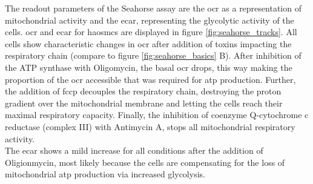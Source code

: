     The readout parameters of the Seahorse assay are the \ac{ocr} as a representation of mitochondrial activity and the \ac{ecar}, representing the glycolytic activity of the cells. \ac{ocr} and \ac{ecar} for \acp{haosmc} are displayed in figure \ref{fig:seahorse_tracks}. All cells show characteristic changes in \ac{ocr} after addition of toxins impacting the respiratory chain (compare to figure \ref{fig:seahorse_basics} B). After inhibition of the ATP synthase with Oligomycin, the basal \ac{ocr} drops, this way making the proportion of the \ac{ocr} accessible that was required for \ac{atp} production. Further, the addition of \ac{fccp} decouples the respiratory chain, destroying the proton gradient over the mitochondrial membrane and letting the cells reach their maximal respiratory capacity. Finally, the inhibition of coenzyme Q-cytochrome c reductase (complex III) with Antimycin A, stops all mitochondrial respiratory activity.\\
    The \ac{ecar} shows a mild increase for all conditions after the addition of Oligionmycin, most likely because the cells are compensating for the loss of mitochondrial \ac{atp} production via increased glycolysis.

